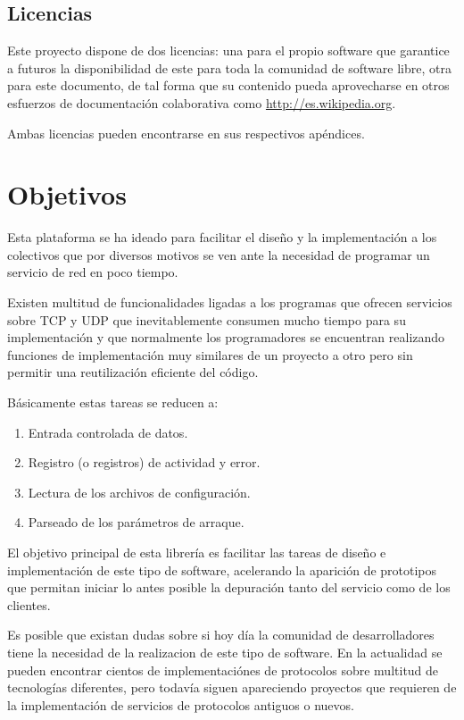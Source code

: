 \documentclass[a4paper,spanish,12pt]{book}
\begin{document}
\section{Licencias}
Este proyecto dispone de dos licencias: una para el propio software que garantice a futuros la disponibilidad de este para toda la comunidad de software libre, otra para este documento, de tal forma que su contenido pueda aprovecharse en otros esfuerzos de documentación colaborativa como \url{http://es.wikipedia.org}.

Ambas licencias pueden encontrarse en sus respectivos ap\'endices.
\chapter{Objetivos}

Esta plataforma se ha ideado para facilitar el diseño y la implementación a los colectivos que por diversos motivos se ven ante la necesidad de programar un servicio de red en poco tiempo. 

Existen multitud de funcionalidades ligadas a los programas que ofrecen servicios sobre TCP y UDP que inevitablemente consumen mucho tiempo para su implementación y que normalmente los programadores se encuentran realizando funciones de implementación muy similares de un proyecto a otro pero sin permitir una reutilización eficiente del código.

Básicamente estas tareas se reducen a:
\begin{enumerate}
	\item Entrada controlada de datos.
	\item Registro (o registros) de actividad y error.
	\item Lectura de los archivos de configuraci\'on.
	\item Parseado de los parámetros de arraque.
\end{enumerate}

El objetivo principal de esta librería es facilitar las tareas de diseño e implementación de este tipo de software, acelerando la aparición de prototipos que permitan iniciar lo antes posible la depuración tanto del servicio como de los clientes.

Es posible que existan dudas sobre si hoy día la comunidad de desarrolladores tiene la necesidad de la realizacion de este tipo de software. En la actualidad se pueden encontrar cientos de implementaciónes de protocolos sobre multitud de tecnologías diferentes, pero todavía siguen apareciendo proyectos que requieren de la implementación de servicios de protocolos antiguos o nuevos.
\end{document}
